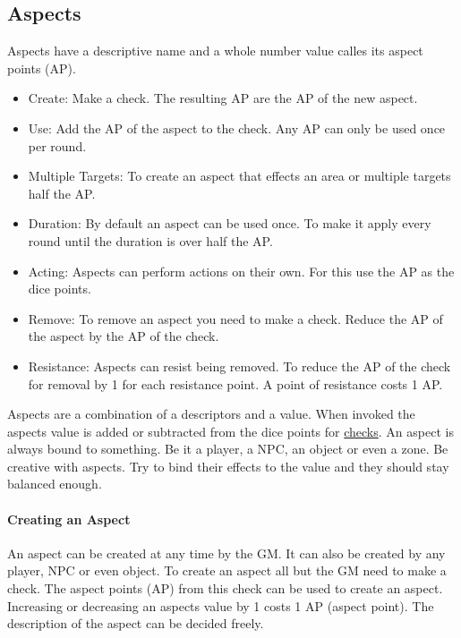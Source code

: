 \documentclass[11pt]{article}
\begin{document}
{\subsection{Aspects}
\label{sec:org253a543}
\begin{short}
Aspects have a descriptive name and a whole number value calles its aspect points (AP).
\begin{itemize}
\item Create: Make a check. The resulting AP are the AP of the new aspect.
\item Use: Add the AP of the aspect to the check. Any AP can only be used once per round.
\item Multiple Targets: To create an aspect that effects an area or multiple targets half the AP.
\item Duration: By default an aspect can be used once. To make it apply every round until the duration is over half the AP.
\item Acting: Aspects can perform actions on their own. For this use the AP as the dice points.
\item Remove: To remove an aspect you need to make a check. Reduce the AP of the aspect by the AP of the check.
\item Resistance: Aspects can resist being removed. To reduce the AP of the check for removal by 1 for each resistance point. A point of resistance costs 1 AP.
\end{itemize}
\end{short}


Aspects are a combination of a descriptors and a value. When invoked the aspects value is added or subtracted from the dice points  for \hyperref[sec:orga558452]{checks}. An aspect is always bound to something. Be it a player, a NPC, an object or even a zone. Be creative with aspects. Try to bind their effects to the value and they should stay balanced enough.

\paragraph*{Creating an Aspect}
\label{sec:org0da7d5b}

An aspect can be created at any time by the GM. It can also be created by any player, NPC or even object. To create an aspect all but the GM need to make a check. The aspect points (AP) from this check can be used to create an aspect. Increasing or decreasing an aspects value by 1 costs 1 AP (aspect point). The description of the aspect can be decided freely. 

}
\end{document}
